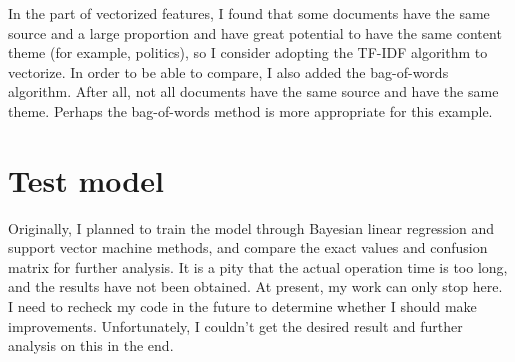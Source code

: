 \documentclass[12pt]{article}
\begin{document}
In the part of vectorized features, I found that some documents have the same source and a large proportion and have great potential to have the same content theme (for example, politics), so I consider adopting the TF-IDF algorithm to vectorize. In order to be able to compare, I also added the bag-of-words algorithm. After all, not all documents have the same source and have the same theme. Perhaps the bag-of-words method is more appropriate for this example.

\section{Test model}

Originally, I planned to train the model through Bayesian linear regression and support vector machine methods, and compare the exact values and confusion matrix for further analysis. It is a pity that the actual operation time is too long, and the results have not been obtained. At present, my work can only stop here. I need to recheck my code in the future to determine whether I should make improvements. Unfortunately, I couldn't get the desired result and further analysis on this in the end.
\end{document}
